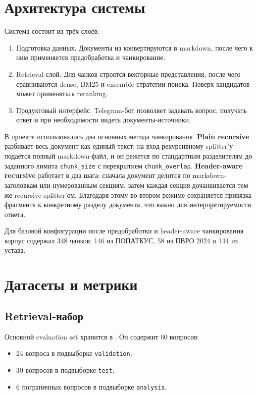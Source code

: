 \documentclass[12pt,a4paper]{article}
\begin{document}
\section{Архитектура системы}

Система состоит из трёх слоёв:
\begin{enumerate}
    \item Подготовка данных. Документы из  конвертируются в markdown, после чего к ним применяется предобработка и чанкирование.
    \item Retrieval-слой. Для чанков строятся векторные представления, после чего сравниваются dense, BM25 и ensemble-стратегии поиска. Поверх кандидатов может применяться reranking.
    \item Продуктовый интерфейс. Telegram-бот позволяет задавать вопрос, получать ответ и при необходимости видеть документы-источники.
\end{enumerate}

В проекте использовались два основных метода чанкирования. \textbf{Plain recursive} разбивает весь документ как единый текст: на вход рекурсивному splitter'у подаётся полный markdown-файл, и он режется по стандартным разделителям до заданного лимита \texttt{chunk\_size} с перекрытием \texttt{chunk\_overlap}. \textbf{Header-aware recursive} работает в два шага: сначала документ делится по markdown-заголовкам или нумерованным секциям, затем каждая секция дочанкивается тем же recursive splitter'ом. Благодаря этому во втором режиме сохраняется привязка фрагмента к конкретному разделу документа, что важно для интерпретируемости ответа.

Для базовой конфигурации после предобработки и header-aware чанкирования корпус содержал 348 чанков: 146 из ПОПАТКУС, 58 из ПВРО 2024 и 144 из устава.

\section{Датасеты и метрики}

\subsection{Retrieval-набор}

Основной evaluation set хранится в . Он содержит 60 вопросов:
\begin{itemize}
    \item 24 вопроса в подвыборке \texttt{validation};
    \item 30 вопросов в подвыборке \texttt{test};
    \item 6 пограничных вопросов в подвыборке \texttt{analysis}.
\end{itemize}
\end{document}
